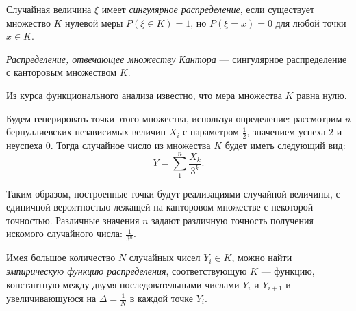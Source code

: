 \documentclass[12pt, a4paper]{article}
\begin{document}
\begin{df}
Случайная величина $\xi$ имеет \textit{сингулярное распределение}, если существует множество $K$ нулевой меры $P(\xi\in K) = 1$, но $P(\xi = x) = 0$ для любой точки $x\in K$.
\end{df}

\begin{df}
\textit{Распределение, отвечающее множеству Кантора} --- сингулярное распределение с канторовым множеством $K$.
\end{df}

Из курса функционального анализа \cite{Kolmogorov_Fomin} известно, что мера множества $K$ равна нулю.

Будем генерировать точки этого множества, используя определение: рассмотрим $n$ бернуллиевских независимых величин $X_i$ с параметром $\frac 12$, значением успеха $2$ и неуспеха $0$. Тогда случайное число из множества $K$ будет иметь следующий вид:
\[ Y = \sum\limits_1^n \frac{X_k}{3^k}. \]

Таким образом, построенные точки будут реализациями случайной величины, с единичной вероятностью лежащей на канторовом множестве с некоторой точностью. Различные значения $n$ задают различную точность получения искомого случайного числа: $\frac{1}{3^{n}}$.

Имея большое количество $N$ случайных чисел $Y_i \in K$, можно найти \textit{эмпирическую функцию распределения}, соответствующую $K$ --- функцию, константную между двумя последовательными числами $Y_i$ и $Y_{i+1}$ и увеличивающуюся на $\Delta = \frac 1N$ в каждой точке $Y_i$.
\end{document}

